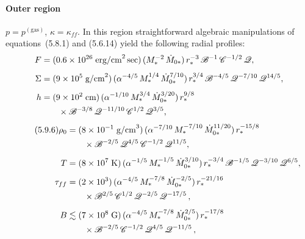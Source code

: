 \paragraph{Outer region}

$p = p^{(\text{gas})}$, $\kappa = \kappa_{ff}$.  In this region straightforward algebraic manipulations of
equations~(5.8.1) and (5.6.14) yield the following radial profiles:
%
\begin{align}
F &= (0.6 \times 10^{26}\;\text{erg/cm}^2\,\text{sec})\,
    (M_*^{-2}\,\dot{M}_{0*})\,
    r_*^{-3}\,\mathscr{B}^{-1}\,\mathscr{C}^{-1/2}\,\mathscr{Q}, \notag \\[4pt]
%
\Sigma &= (9 \times 10^{5}\;\text{g/cm}^2)\,
    (\alpha^{-4/5}\,M_*^{1/4}\,\dot{M}_{0*}^{7/10})\,
    r_*^{3/4}\,\mathscr{B}^{-4/5}\,\mathscr{Q}^{-7/10}\,\mathscr{Q}^{14/5}, \notag \\[4pt]
%
h &= (9 \times 10^{2}\;\text{cm})\,
    (\alpha^{-1/10}\,M_*^{3/4}\,\dot{M}_{0*}^{3/20})\,
    r_*^{9/8}\notag \\
  &\qquad \times \mathscr{B}^{-3/8}\,\mathscr{Q}^{-11/10}\,
    \mathscr{C}^{1/2}\,\mathscr{Q}^{3/5}, \notag
\end{align}
%
\begin{align}
\tag{5.9.6}
\rho_0 &= (8 \times 10^{-1}\;\text{g/cm}^3)\,
    (\alpha^{-7/10}\,M_*^{-7/10}\,\dot{M}_{0*}^{11/20})\,
    r_*^{-15/8} \notag \\
  &\qquad \times \mathscr{B}^{-2/5}\,\mathscr{Q}^{4/5}\,\mathscr{C}^{-1/2}\,\mathscr{Q}^{11/5}, \notag \\[4pt]
%
T &= (8 \times 10^{7}\;\text{K})\,
    (\alpha^{-1/5}\,M_*^{-1/5}\,\dot{M}_{0*}^{3/10})\,
    r_*^{-3/4}\,
    \mathscr{B}^{-1/5}\,\mathscr{Q}^{-3/10}\,\mathscr{Q}^{6/5}, \notag \\[4pt]
%
\tau_{ff} &= (2 \times 10^{3})\,
    (\alpha^{-4/5}\,M_*^{-7/8}\,\dot{M}_{0*}^{-2/5})\,
    r_*^{-21/16}\notag \\
  &\qquad \times \mathscr{B}^{2/5}\,\mathscr{C}^{1/2}\,
    \mathscr{Q}^{-2/5}\,\mathscr{Q}^{-17/5}\,, \notag \\[4pt]
%
B &\lesssim (7 \times 10^{8}\;\text{G})\,
    (\alpha^{-4/5}\,M_*^{-7/8}\,\dot{M}_{0*}^{2/5})\,
    r_*^{-17/8}\notag \\
  &\qquad \times \mathscr{B}^{-2/5}\,\mathscr{C}^{-1/2}\,
    \mathscr{Q}^{4/5}\,\mathscr{Q}^{-11/5}\,, \notag
\end{align}
%
